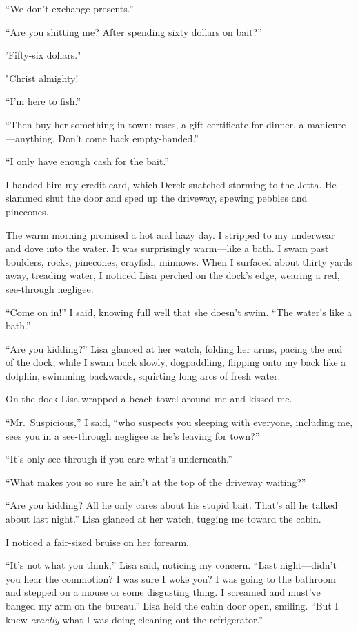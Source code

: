 ``We don't exchange presents.''

``Are you shitting me? After spending sixty dollars on bait?''

'Fifty-six dollars."

"Christ almighty!

``I'm here to fish.''

``Then buy her something in town: roses, a gift certificate for dinner,
a manicure---anything. Don't come back empty-handed.''

``I only have enough cash for the bait.''

I handed him my credit card, which Derek snatched storming to the Jetta.
He slammed shut the door and sped up the driveway, spewing pebbles and
pinecones.

The warm morning promised a hot and hazy day. I stripped to my underwear
and dove into the water. It was surprisingly warm---like a bath. I swam
past boulders, rocks, pinecones, crayfish, minnows. When I surfaced
about thirty yards away, treading water, I noticed Lisa perched on the
dock's edge, wearing a red, see-through negligee.

``Come on in!'' I said, knowing full well that she doesn't swim. ``The
water's like a bath.''

``Are you kidding?'' Lisa glanced at her watch, folding her arms, pacing
the end of the dock, while I swam back slowly, dogpaddling, flipping
onto my back like a dolphin, swimming backwards, squirting long arcs of
fresh water.

On the dock Lisa wrapped a beach towel around me and kissed me.

``Mr.~Suspicious,'' I said, ``who suspects you sleeping with everyone,
including me, sees you in a see-through negligee as he's leaving for
town?''

``It's only see-through if you care what's underneath.''

``What makes you so sure he ain't at the top of the driveway waiting?''

``Are you kidding? All he only cares about his stupid bait. That's all
he talked about last night.'' Lisa glanced at her watch, tugging me
toward the cabin.

I noticed a fair-sized bruise on her forearm.

``It's not what you think,'' Lisa said, noticing my concern. ``Last
night---didn't you hear the commotion? I was sure I woke you? I was
going to the bathroom and stepped on a mouse or some disgusting thing. I
screamed and must've banged my arm on the bureau.'' Lisa held the cabin
door open, smiling. ``But I knew \emph{exactly} what I was doing
cleaning out the refrigerator.''

